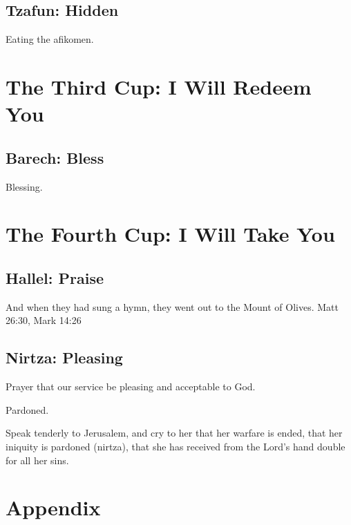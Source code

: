 \documentclass[10pt,oneside,footinclude=true,headinclude=true]{scrbook} %
\begin{document}
\chapter{Tzafun: Hidden}
Eating the afikomen.


\part{The Third Cup: I Will Redeem You}

\chapter{Barech: Bless}
Blessing.


\part{The Fourth Cup: I Will Take You}

\chapter{Hallel: Praise}
And when they had sung a hymn, they went out to the Mount of Olives. Matt 26:30, Mark 14:26

\chapter{Nirtza: Pleasing}
Prayer that our service be pleasing and acceptable to God.

Pardoned.

Speak tenderly to Jerusalem,
    and cry to her
that her warfare is ended,
    that her iniquity is pardoned (nirtza),
that she has received from the Lord's hand
    double for all her sins.



\appendix
\cleardoublepage
\part{Appendix}
\end{document}
